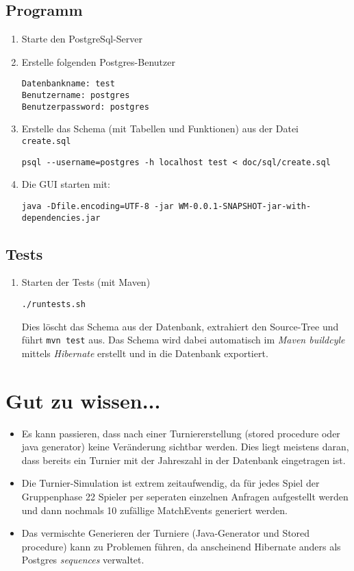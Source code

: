 \documentclass[11pt,german]{scrartcl}
\begin{document}
\subsection*{Programm}
\begin{enumerate}
\item Starte den PostgreSql-Server
\item Erstelle folgenden Postgres-Benutzer
\begin{verbatim}Datenbankname: test
Benutzername: postgres
Benutzerpassword: postgres\end{verbatim}

\item Erstelle das Schema (mit Tabellen und Funktionen) aus der Datei {\tt create.sql}
\begin{lstlisting}
psql --username=postgres -h localhost test < doc/sql/create.sql
\end{lstlisting}

\item Die GUI starten mit:
\begin{lstlisting}
java -Dfile.encoding=UTF-8 -jar WM-0.0.1-SNAPSHOT-jar-with-dependencies.jar
\end{lstlisting}
\end{enumerate}



\subsection*{Tests}

\begin{enumerate}
\item Starten der Tests (mit Maven)
\begin{lstlisting}
./runtests.sh
\end{lstlisting}
Dies löscht das Schema aus der Datenbank, extrahiert den Source-Tree und führt {\tt mvn test} aus. Das Schema wird dabei automatisch im \emph{Maven buildcyle} mittels \emph{Hibernate} erstellt und in die Datenbank exportiert.
\end{enumerate}


\section*{Gut zu wissen...}
\begin{itemize}
\item Es kann passieren, dass nach einer Turniererstellung (stored procedure oder java generator) keine Veränderung sichtbar werden.
Dies liegt meistens daran, dass bereits ein Turnier mit der Jahreszahl in der Datenbank eingetragen ist.

\item Die Turnier-Simulation ist extrem zeitaufwendig, da für jedes Spiel der Gruppenphase 22 Spieler per seperaten einzelnen Anfragen aufgestellt werden und dann nochmals 10 zufällige MatchEvents generiert werden.

\item Das vermischte Generieren der Turniere (Java-Generator und Stored procedure) kann zu Problemen führen, da anscheinend Hibernate anders als Postgres {\it sequences} verwaltet.
\end{itemize}
\end{document}
